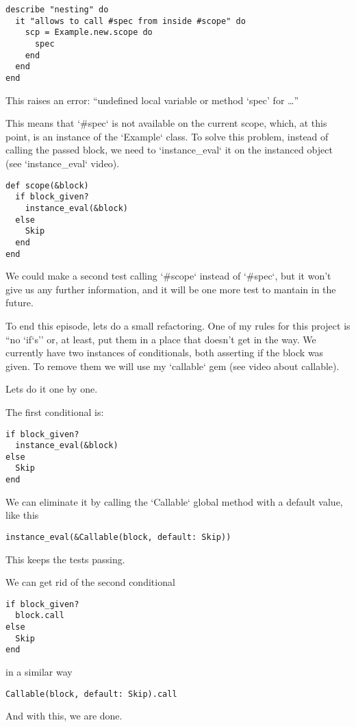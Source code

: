 \documentclass[11pt]{article}
\begin{document}
\begin{verbatim}
describe "nesting" do
  it "allows to call #spec from inside #scope" do
    scp = Example.new.scope do
      spec
    end
  end
end
\end{verbatim}

This raises an error: ``undefined local variable or method `spec' for \ldots{}''

This means that `\#spec` is not available on the current scope, which, at this point, is an instance of the `Example` class. To solve this problem, instead of calling the passed block, we need to `instance\_{}eval` it on the instanced object (see `instance\_{}eval` video).


\begin{verbatim}
def scope(&block)
  if block_given?
    instance_eval(&block)
  else
    Skip
  end
end
\end{verbatim}

We could make a second test calling `\#scope` instead of `\#spec`, but it won't give us any further information, and it will be one more test to mantain in the future.

To end this episode, lets do a small refactoring. One of my rules for this project is ``no `if`s'' or, at least, put them in a place that doesn't get in the way. We currently have two instances of conditionals, both asserting if the block was given. To remove them we will use my `callable` gem (see video about callable).

Lets do it one by one.

The first conditional is: 


\begin{verbatim}
if block_given?
  instance_eval(&block)
else
  Skip
end
\end{verbatim}

We can eliminate it by calling the `Callable` global method with a default value, like this


\begin{verbatim}
instance_eval(&Callable(block, default: Skip))
\end{verbatim}

This keeps the tests passing.

We can get rid of the second conditional


\begin{verbatim}
if block_given?
  block.call
else
  Skip
end
\end{verbatim}

in a similar way


\begin{verbatim}
Callable(block, default: Skip).call
\end{verbatim}

And with this, we are done.
\end{document}
